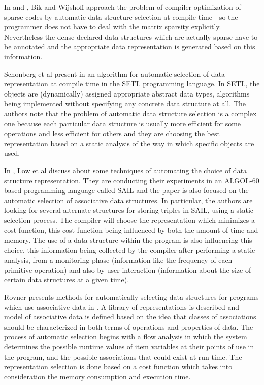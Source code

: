 In \cite{29} and \cite{30}, Bik and Wijshoff  approach the problem of compiler optimization of sparse codes by automatic data structure selection at compile time - so the programmer does not have to deal with the matrix sparsity explicitly. Nevertheless the dense declared data structures which are actually sparse have to be annotated and the appropriate data representation is generated based on this information.

Schonberg et al present in \cite{31} an algorithm for automatic selection of data representation at compile time in the SETL programming language. In SETL, the objects are (dynamically) assigned appropriate abstract data types, algorithms being implemented without specifying any concrete data structure at all. The authors note that the problem of automatic data structure selection is a complex one because each particular data structure is usually more efficient for some operations and less efficient for others and they are choosing the best representation based on a static analysis of the way in which specific objects are used.

In \cite{lowrovner}, Low et al discuss about some techniques of automating the choice of data structure representation. They are conducting their experiments in an ALGOL-60 based programming language called SAIL and the paper is also focused on the automatic selection of associative data structures. In particular, the authors are looking for several alternate structures for storing triples in SAIL, using a static selection process. The compiler will choose the representation which minimizes a cost function, this cost function being influenced by both the amount of time and memory. The use of a data structure within the program is also influencing this choice, this information being collected by the compiler after performing a static analysis, from a monitoring phase (information like the frequency of each primitive operation) and also by user interaction (information about the size of certain data structures at a given time). 

Rovner presents methods for automatically selecting data structures for programs which use associative data in \cite{rovner}. A library of representations is described and model of associative data is defined based on the idea that classes of associations should be characterized in both terms of operations and properties of data. The process of automatic selection begins with a flow analysis in which the system determines the possible runtime values of item variables at their points of use in the program, and the possible associations that could exist at run-time. The representation selection is done based on a cost function which takes into consideration the memory consumption and execution time. 

